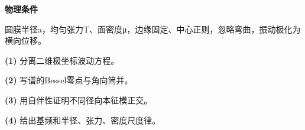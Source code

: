 \textbf{物理条件}\par 圆膜半径a，均匀张力T、面密度μ，边缘固定、中心正则，忽略弯曲，振动极化为横向位移。
\par\noindent\textbf{(1)} 分离二维极坐标波动方程。
\par\noindent\textbf{(2)} 写谱的Bessel零点与角向简并。
\par\noindent\textbf{(3)} 用自伴性证明不同径向本征模正交。
\par\noindent\textbf{(4)} 给出基频和半径、张力、密度尺度律。
